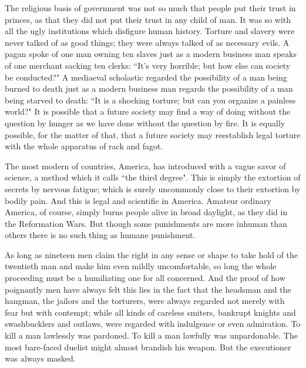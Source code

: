 \documentclass[final,10pt,letterpaper,twocolumn,openany]{book}
\begin{document}
The religious basis of government was not so much that people
put their trust in princes, as that they did not put their trust in any child of
man. It was so with all the ugly institutions which disfigure human history.
Torture and slavery were never talked of as good things; they were always
talked of as necessary evils. A pagan spoke of one man owning ten slaves
just as a modern business man speaks of one merchant sacking ten clerks:
``It's very horrible; but how else can society be conducted?" A mediaeval
scholastic regarded the possibility of a man being burned to death just as a
modern business man regards the possibility of a man being starved to
death: ``It is a shocking torture; but can you organize a painless world?" It
is possible that a future society may find a way of doing without the
question by hunger as we have done without the question by fire. It is
equally possible, for the matter of that, that a future society may
reestablish legal torture with the whole apparatus of rack and fagot.

The
most modern of countries, America, has introduced with a vague savor of
science, a method which it calls ``the third degree". This is simply the
extortion of secrets by nervous fatigue; which is surely uncommonly close
to their extortion by bodily pain. And this is legal and scientific in America.
Amateur ordinary America, of course, simply burns people alive in broad
daylight, as they did in the Reformation Wars. But though some
punishments are more inhuman than others there is no such thing as
humane punishment.

As long as nineteen men claim the right in any sense
or shape to take hold of the twentieth man and make him even mildly
uncomfortable, so long the whole proceeding must be a humiliating one
for all concerned. And the proof of how poignantly men have always felt
this lies in the fact that the headsman and the hangman, the jailors and the
torturers, were always regarded not merely with fear but with contempt;
while all kinds of careless smiters, bankrupt knights and swashbucklers
and outlaws, were regarded with indulgence or even admiration. To kill a
man lawlessly was pardoned. To kill a man lawfully was unpardonable.
The most bare-faced duelist might almost brandish his weapon. But the
executioner was always masked.
\end{document}
